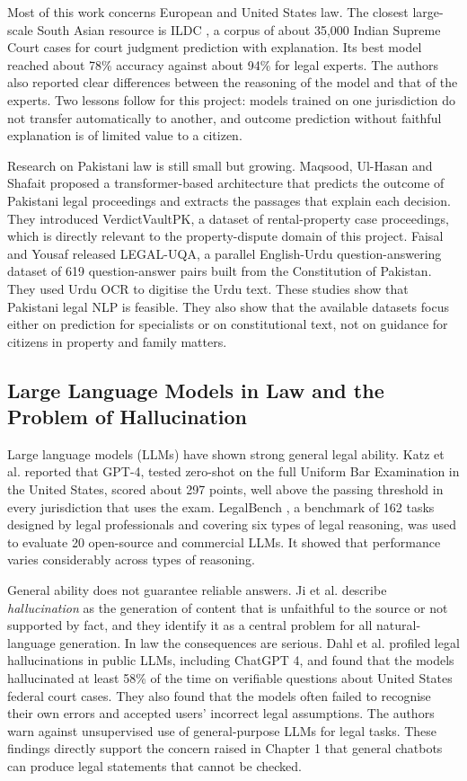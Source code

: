 Most of this work concerns European and United States law. The closest large-scale South Asian resource is ILDC \cite{r5}, a corpus of about 35,000 Indian Supreme Court cases for court judgment prediction with explanation. Its best model reached about 78\% accuracy against about 94\% for legal experts. The authors also reported clear differences between the reasoning of the model and that of the experts. Two lessons follow for this project: models trained on one jurisdiction do not transfer automatically to another, and outcome prediction without faithful explanation is of limited value to a citizen.

Research on Pakistani law is still small but growing. Maqsood, Ul-Hasan and Shafait \cite{r18} proposed a transformer-based architecture that predicts the outcome of Pakistani legal proceedings and extracts the passages that explain each decision. They introduced VerdictVaultPK, a dataset of rental-property case proceedings, which is directly relevant to the property-dispute domain of this project. Faisal and Yousaf \cite{r19} released LEGAL-UQA, a parallel English-Urdu question-answering dataset of 619 question-answer pairs built from the Constitution of Pakistan. They used Urdu OCR to digitise the Urdu text. These studies show that Pakistani legal NLP is feasible. They also show that the available datasets focus either on prediction for specialists or on constitutional text, not on guidance for citizens in property and family matters.

\subsection{Large Language Models in Law and the Problem of Hallucination}

Large language models (LLMs) have shown strong general legal ability. Katz et al. \cite{r7} reported that GPT-4, tested zero-shot on the full Uniform Bar Examination in the United States, scored about 297 points, well above the passing threshold in every jurisdiction that uses the exam. LegalBench \cite{r6}, a benchmark of 162 tasks designed by legal professionals and covering six types of legal reasoning, was used to evaluate 20 open-source and commercial LLMs. It showed that performance varies considerably across types of reasoning.

General ability does not guarantee reliable answers. Ji et al. \cite{r10} describe \emph{hallucination} as the generation of content that is unfaithful to the source or not supported by fact, and they identify it as a central problem for all natural-language generation. In law the consequences are serious. Dahl et al. \cite{r8} profiled legal hallucinations in public LLMs, including ChatGPT 4, and found that the models hallucinated at least 58\% of the time on verifiable questions about United States federal court cases. They also found that the models often failed to recognise their own errors and accepted users' incorrect legal assumptions. The authors warn against unsupervised use of general-purpose LLMs for legal tasks. These findings directly support the concern raised in Chapter 1 that general chatbots can produce legal statements that cannot be checked.

